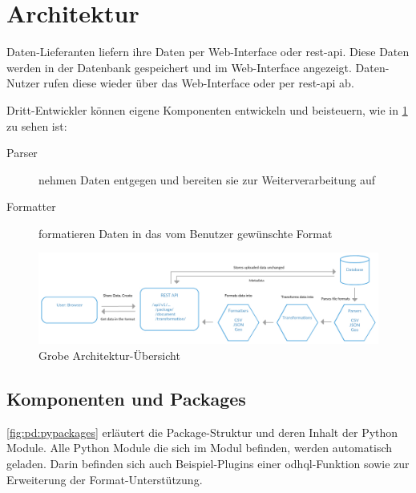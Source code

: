 \section{Architektur}
Daten-Lieferanten liefern ihre Daten per Web-Interface oder \ac{rest}-\ac{api}. Diese Daten werden in der Datenbank gespeichert und im Web-Interface angezeigt. Daten-Nutzer rufen diese wieder über das Web-Interface oder per \ac{rest}-\ac{api} ab. 

Dritt-Entwickler können eigene Komponenten entwickeln und beisteuern, wie in \cref{fig:pd:arch-overview} zu sehen ist:
\begin{description}
\item[Parser] nehmen Daten entgegen und bereiten sie zur Weiterverarbeitung auf
\item[Formatter] formatieren Daten in das vom Benutzer gewünschte Format
\end{description}

\begin{figure}[H]
    \centering
    \includegraphics[width=\linewidth]{fig/ODH-Architecture-Overview}
    \caption{Grobe Architektur-Übersicht}
    \label{fig:pd:arch-overview}
\end{figure}

\subsection{Komponenten und Packages}
\cref{fig:pd:pypackages} erläutert die Package-Struktur und deren Inhalt der Python Module. Alle Python Module die sich im  Modul befinden, werden automatisch geladen. Darin befinden sich auch Beispiel-Plugins einer \acs{odhql}-Funktion sowie zur Erweiterung der Format-Unterstützung.

